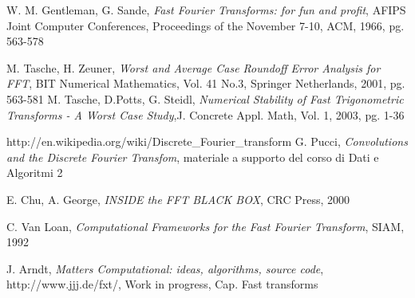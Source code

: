 \begin{thebibliography}{99}

 W. M. Gentleman, G. Sande, \emph{Fast Fourier Transforms: for fun and profit}, AFIPS Joint Computer Conferences, Proceedings of the November 7-10, ACM, 1966, pg. 563-578

M. Tasche, H. Zeuner, \emph{Worst and Average Case Roundoff Error Analysis for FFT}, BIT Numerical Mathematics, Vol. 41 No.3, Springer Netherlands, 2001, pg. 563-581
M. Tasche, D.Potts, G. Steidl, \emph{Numerical Stability of Fast Trigonometric Transforms - A Worst Case Study},J. Concrete Appl. Math, Vol. 1, 2003, pg. 1-36

 http://en.wikipedia.org/wiki/Discrete\_Fourier\_transform
G. Pucci, \emph{Convolutions and the Discrete Fourier Transfom}, materiale a supporto del corso di Dati e Algoritmi 2

 E. Chu, A. George, \emph{INSIDE the FFT BLACK BOX}, CRC Press, 2000

 C. Van Loan, \emph{Computational Frameworks for the Fast Fourier Transform}, SIAM, 1992

 J. Arndt, \emph{Matters Computational: ideas, algorithms, source code}, http://www.jjj.de/fxt/, Work in progress, Cap. Fast transforms





\end{thebibliography}